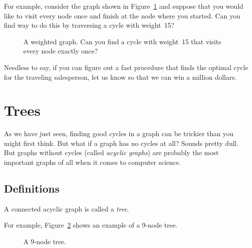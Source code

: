 For example, consider the graph shown in Figure~\ref{fig:5AL} and
suppose that you would like to visit every node once and finish at the
node where you started.  Can you find  way to do this by traversing a
cycle with weight~15?

\begin{figure}


\caption{A weighted graph.  Can you find a cycle with weight~15 that
  visits every node exactly once?}

\label{fig:5AL}
\end{figure}

Needless to say, if you can figure out a fast procedure that finds the
optimal cycle for the traveling salesperson, let us know so that we
can win a million dollars.

\begin{problems}
\examproblems
{}

\homeworkproblems
{}
\end{problems}

\section{Trees}\label{trees-sec}

As we have just seen, finding good cycles in a graph can be trickier
than you might first think.  But what if a graph has no cycles at all?
Sounds pretty dull.  But graphs without cycles (called \emph{acyclic
  graphs}) are probably the most important graphs of all when it comes
to computer science.

\subsection{Definitions}

\begin{definition}\label{def:tree}
A connected acyclic graph is called a \emph{tree}.
\end{definition}

For example, Figure~\ref{fig:5H} shows an example of a 9-node tree.

\begin{figure}


\caption{A 9-node tree.}
\label{fig:5H}
\end{figure}

